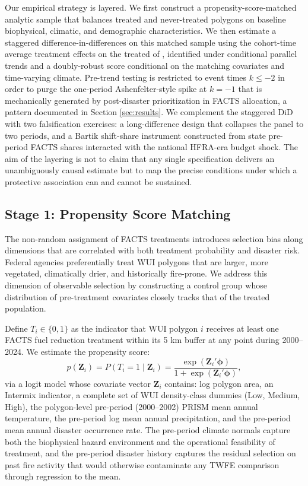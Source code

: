 \documentclass[12pt, letterpaper]{article}
\begin{document}
Our empirical strategy is layered. We first construct a propensity-score-matched analytic sample that balances treated and never-treated polygons on baseline biophysical, climatic, and demographic characteristics. We then estimate a staggered difference-in-differences on this matched sample using the cohort-time average treatment effects on the treated of \citet{callaway2021}, identified under conditional parallel trends and a doubly-robust score conditional on the matching covariates and time-varying climate. Pre-trend testing is restricted to event times $k \leq -2$ in order to purge the one-period Ashenfelter-style spike at $k = -1$ that is mechanically generated by post-disaster prioritization in FACTS allocation, a pattern documented in Section \ref{sec:results}. We complement the staggered DiD with two falsification exercises: a long-difference design that collapses the panel to two periods, and a Bartik shift-share instrument constructed from state pre-period FACTS shares interacted with the national HFRA-era budget shock. The aim of the layering is not to claim that any single specification delivers an unambiguously causal estimate but to map the precise conditions under which a protective association can and cannot be sustained.

\subsection{Stage 1: Propensity Score Matching}\label{sec:psm}

The non-random assignment of FACTS treatments introduces selection bias along dimensions that are correlated with both treatment probability and disaster risk. Federal agencies preferentially treat WUI polygons that are larger, more vegetated, climatically drier, and historically fire-prone. We address this dimension of observable selection by constructing a control group whose distribution of pre-treatment covariates closely tracks that of the treated population.

Define $T_i \in \{0, 1\}$ as the indicator that WUI polygon $i$ receives at least one FACTS fuel reduction treatment within its 5 km buffer at any point during 2000--2024. We estimate the propensity score:
\begin{equation}
p(\mathbf{Z}_i) = P(T_i = 1 \mid \mathbf{Z}_i) = \frac{\exp(\mathbf{Z}_i' \boldsymbol{\phi})}{1 + \exp(\mathbf{Z}_i' \boldsymbol{\phi})},
\label{eq:propensity}
\end{equation}
via a logit model whose covariate vector $\mathbf{Z}_i$ contains: log polygon area, an Intermix indicator, a complete set of WUI density-class dummies (Low, Medium, High), the polygon-level pre-period (2000--2002) PRISM mean annual temperature, the pre-period log mean annual precipitation, and the pre-period mean annual disaster occurrence rate. The pre-period climate normals capture both the biophysical hazard environment and the operational feasibility of treatment, and the pre-period disaster history captures the residual selection on past fire activity that would otherwise contaminate any TWFE comparison through regression to the mean.
\end{document}
